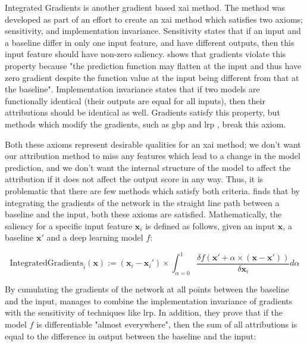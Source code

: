 \documentclass[UKenglish]{uiomasterthesis} %
\theoremstyle{definition}
\begin{document}
Integrated Gradients \cite{integratedgradients} is another gradient based \ac{xai} method. The method was developed as part of an effort to create an \ac{xai} method which satisfies two axioms; sensitivity, and implementation invariance. Sensitivity states that if an input and a baseline differ in only one input feature, and have different outputs, then this input feature should have non-zero saliency. \cite{integratedgradients} shows that gradients violate this property because "the prediction function may flatten at the input and thus have zero gradient despite the function value at the input being different from that at the baseline". Implementation invariance states that if two models are functionally identical (their outputs are equal for all inputs), then their attributions should be identical as well. Gradients satisfy this property, but methods which modify the gradients, such as \ac{gbp} and \ac{lrp} \cite{lrp}, break this axiom.

Both these axioms represent desirable qualities for an \ac{xai} method; we don't want our attribution method to miss any features which lead to a change in the model prediction, and we don't want the internal structure of the model to affect the attribution if it does not affect the output score in any way. Thus, it is problematic that there are few methods which satisfy both criteria. \cite{integratedgradients} finds that by integrating the gradients of the network in the straight line path between a baseline and the input, both these axioms are satisfied. Mathematically, the saliency for a specific input feature $\mathbf{x}_i$ is defined as follows, given an input $\mathbf{x}$, a baseline $\mathbf{x'}$ and a deep learning model $f$:

\begin{equation}
    \text{IntegratedGradients}_i(\mathbf{x}) := (\mathbf{x}_i - \mathbf{x}_i') \times \int_{\alpha = 0}^1 \frac{\delta f(\mathbf{x}' + \alpha \times (\mathbf{x} - \mathbf{x}'))}{\delta \mathbf{x}_i}d\alpha
\end{equation}

By cumulating the gradients of the network at all points between the baseline and the input, \cite{integratedgradients} manages to combine the implementation invariance of gradients with the sensitivity of techniques like \ac{lrp}. In addition, they prove that if the model $f$ is differentiable "almost everywhere", then the sum of all attributions is equal to the difference in output between the baseline and the input:
\end{document}
